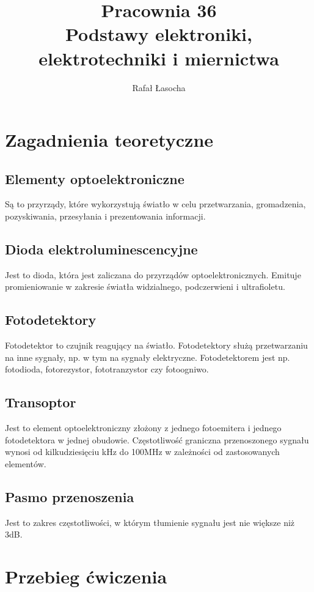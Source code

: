 \documentclass[a4paper,11pt]{article}
\title{
  \textbf{Pracownia 36}\\
  {\Large Podstawy elektroniki, elektrotechniki i miernictwa}
}
\author{Rafał Łasocha}
\begin{document}
\maketitle

\section{Zagadnienia teoretyczne}

\subsection{Elementy optoelektroniczne}
Są to przyrządy, które wykorzystują światło w celu przetwarzania, gromadzenia, pozyskiwania, przesyłania i prezentowania informacji.

\subsection{Dioda elektroluminescencyjne}
Jest to dioda, która jest zaliczana do przyrządów optoelektronicznych. Emituje promieniowanie w zakresie światła widzialnego, podczerwieni i ultrafioletu.

\subsection{Fotodetektory}
Fotodetektor to czujnik reagujący na światło. Fotodetektory służą przetwarzaniu na inne sygnały, np. w tym na sygnały elektryczne. Fotodetektorem jest np. fotodioda, fotorezystor, fototranzystor czy fotoogniwo.

\subsection{Transoptor}
Jest to element optoelektroniczny złożony z jednego fotoemitera i jednego fotodetektora w jednej obudowie. Częstotliwość graniczna przenoszonego sygnału wynosi od kilkudziesięciu kHz do 100MHz w zależności od zastosowanych elementów.

\subsection{Pasmo przenoszenia}
Jest to zakres częstotliwości, w którym tłumienie sygnału jest nie większe niż 3dB. 

\section{Przebieg ćwiczenia}
\end{document}
